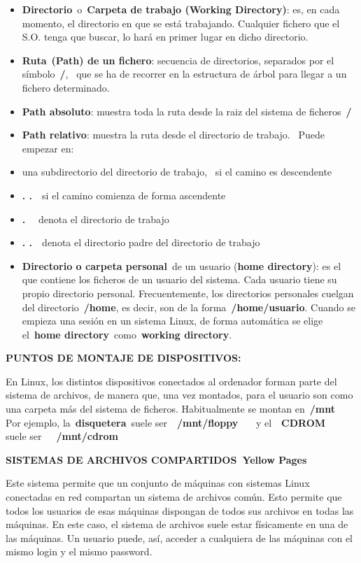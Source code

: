 \documentclass[
  jou,
  floatsintext,
  longtable,
  a4paper,
  nolmodern,
  notxfonts,
  notimes,
  12pt,
  colorlinks=true,linkcolor=blue,citecolor=blue,urlcolor=blue]{apa7}
\begin{document}
\begin{itemize}
\item
  \textbf{Directorio}~o~\textbf{Carpeta de trabajo (Working Directory)}:
  es, en cada momento, el directorio en que se está trabajando.
  Cualquier fichero que el S.O. tenga que buscar, lo hará en primer
  lugar en dicho directorio.
\item
  \textbf{Ruta}~\textbf{(Path) de un fichero}: secuencia de directorios,
  separados por el símbolo~\textbf{/},~ que se ha de recorrer en la
  estructura de árbol para llegar a un fichero determinado.
\item
  \textbf{Path absoluto}: muestra toda la ruta desde la raiz del sistema
  de ficheros~\textbf{/}
\item
  \textbf{Path relativo}: muestra la ruta desde el directorio de
  trabajo.~ Puede empezar en:
\item
  una subdirectorio del directorio de trabajo,~ si el camino es
  descendente
\item
  \textbf{. .}~~si el camino comienza de forma ascendente
\item
  \textbf{.}~~ denota el directorio de trabajo
\item
  \textbf{. .}~~denota el directorio padre del directorio de trabajo
\item
  \textbf{Directorio o carpeta personal}~de un usuario (\textbf{home
  directory}): es el que contiene los ficheros de un usuario del
  sistema. Cada usuario tiene su propio directorio personal.
  Frecuentemente, los directorios personales cuelgan del
  directorio~\textbf{/home}, es decir, son de la
  forma~\textbf{/home/usuario}. Cuando se empieza una sesión en un
  sistema Linux, de forma automática se elige el~\textbf{home
  directory}~como~\textbf{working directory}.
\end{itemize}

\textbf{PUNTOS DE MONTAJE DE DISPOSITIVOS:}

En Linux, los distintos dispositivos conectados al ordenador forman
parte del sistema de archivos, de manera que, una vez montados, para el
usuario son como una carpeta más del sistema de ficheros. Habitualmente
se montan en~\textbf{/mnt}\\
Por ejemplo, la~\textbf{disquetera}~suele ser~~\textbf{/mnt/floppy}~~~ y
el~~\textbf{CDROM}~~ suele ser~~~\textbf{/mnt/cdrom}

\textbf{SISTEMAS DE ARCHIVOS COMPARTIDOS~Yellow Pages}

Este sistema permite que un conjunto de máquinas con sistemas Linux~
conectadas en red compartan un sistema de archivos común. Esto permite
que todos los usuarios de esas máquinas dispongan de todos sus archivos
en todas las máquinas. En este caso, el sistema de archivos suele estar
físicamente en una de las máquinas. Un usuario puede, así, acceder a
cualquiera de las máquinas con el mismo login y el mismo password.
\end{document}
